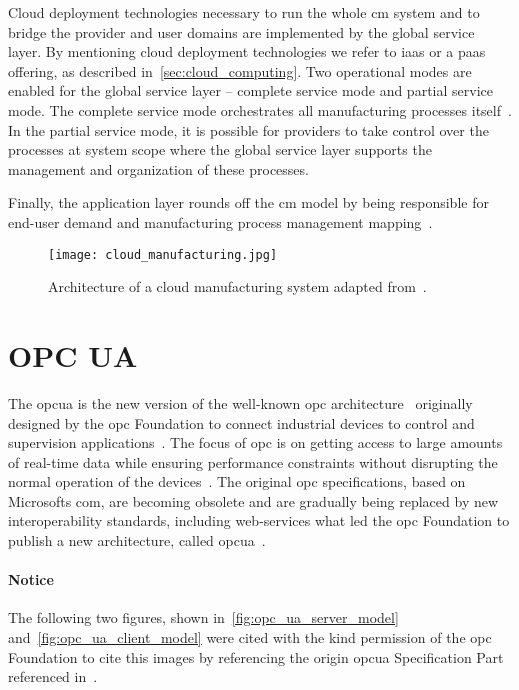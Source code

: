 \documentclass[
a4paper,
twoside,
headsepline,
cleardoublepage=empty,
parskip=half,
draft=false
]{scrbook}
\begin{document}
			Cloud deployment technologies necessary to run the whole \gls{cm} system and to bridge the provider and user domains are implemented by the global service layer.
			By mentioning cloud deployment technologies we refer to \gls{iaas} or a \gls{paas} offering, as described in~\cref{sec:cloud_computing}.
			Two operational modes are enabled for the global service layer -- complete service mode and partial service mode.
			The complete service mode orchestrates all manufacturing processes itself~\cite{xu2012cloud}.
			In the partial service mode, it is possible for providers to take control over the processes at system scope where the global service layer supports the management and organization of these processes.
			
			Finally, the application layer rounds off the \gls{cm} model by being responsible for end-user demand and manufacturing process management mapping~\cite{xu2012cloud}.
			
			\begin{figure}[htbp]
				\centering
				\texttt{[image: cloud\_manufacturing.jpg]}
				\caption{Architecture of a cloud manufacturing system adapted from~\cite{xu2012cloud}.}
				\label{fig:cloud_manufacturing}
			\end{figure}

		\section{OPC UA} \label{sec:opc_ua}

			The \gls{opcua} is the new version of the well-known \gls{opc} architecture~\cite{hadlich2006providing} originally designed by the \gls{opc} Foundation to connect industrial devices to control and supervision applications~\cite{henssen2014online}. 
			The focus of \gls{opc} is on getting access to large amounts of real-time data while ensuring performance constraints without disrupting the normal operation of the devices~\cite{candido2010soa}.
			The original \gls{opc} specifications, based on Microsofts \gls{com}, are becoming obsolete and are gradually being replaced by new interoperability standards, including web-services what led the \gls{opc} Foundation to publish a new architecture, called \gls{opcua}~\cite{hadlich2006providing}.
			
			\paragraph{Notice} The following two figures, shown in~\cref{fig:opc_ua_server_model} and~\cref{fig:opc_ua_client_model} were cited with the kind permission of the \gls{opc} Foundation to cite this images by referencing the origin \gls{opcua} Specification Part referenced in~\cite{opcfoundation2017part1}.
\end{document}
